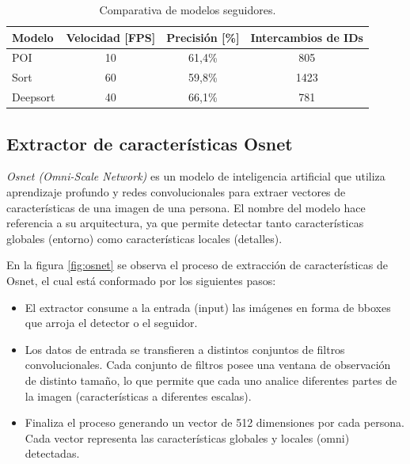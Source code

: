 \begin{table}[h]
	\centering
	\caption[Comparativa de modelos seguidores]{Comparativa de modelos seguidores.}
	\begin{tabular}{l c c c}    
		\toprule
		\textbf{Modelo} & \textbf{Velocidad [FPS]}  & \textbf{Precisión [\%]} & \textbf{Intercambios de IDs} \\
		\midrule
		POI & 10 & 61,4\% & 805 \\
		Sort & 60 & 59,8\% & 1423 \\
		Deepsort & 40 & 66,1\% & 781 \\
		\bottomrule
		\hline
	\end{tabular}
	\label{tab:comparativaSeguidores}
\end{table}

\newpage

\subsection{Extractor de características Osnet}
\label{sec:exactorOsnet}

\textit{Osnet (Omni-Scale Network)} \citep{OSNET} es un modelo de inteligencia artificial que utiliza aprendizaje profundo y redes convolucionales para extraer vectores de características de una imagen de una persona. El nombre del modelo hace referencia a su arquitectura, ya que permite detectar tanto características globales (entorno) como características locales (detalles). 

En la figura \ref{fig:osnet} se observa el proceso de extracción de características de Osnet, el cual está conformado por los siguientes pasos:

\begin{itemize}
\item El extractor consume a la entrada (input) las imágenes en forma de bboxes que arroja el detector o el seguidor.
\item Los datos de entrada se transfieren a distintos conjuntos de filtros convolucionales. Cada conjunto de filtros posee una ventana de observación de distinto tamaño, lo que permite que cada uno analice diferentes partes de la imagen (características a diferentes escalas).
\item Finaliza el proceso generando un vector de 512 dimensiones por cada persona. Cada vector representa las características globales y locales (omni) detectadas.
\end{itemize}

